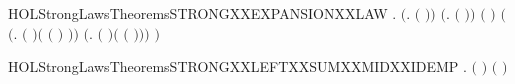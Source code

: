 \begin{SaveVerbatim}{HOLStrongLawsTheoremsSTRONGXXEXPANSIONXXLAW}
\HOLTokenTurnstile{} \HOLSymConst{\HOLTokenForall{}}   .
       \ensuremath{(}\HOLSymConst{\HOLTokenForall{}}.  \HOLSymConst{\HOLTokenLeq{}}  \HOLSymConst{\HOLTokenImp{}}  \ensuremath{(} \ensuremath{)}\ensuremath{)} \HOLSymConst{\HOLTokenConj{}}
       \ensuremath{(}\HOLSymConst{\HOLTokenForall{}}.  \HOLSymConst{\HOLTokenLeq{}}  \HOLSymConst{\HOLTokenImp{}}  \ensuremath{(} \ensuremath{)}\ensuremath{)} \HOLSymConst{\HOLTokenImp{}}
        \ensuremath{(}   \HOLSymConst{\ensuremath{\mid}}   \ensuremath{)}
         \ensuremath{(}
            \ensuremath{(}\HOLTokenLambda{}.  \ensuremath{(} \ensuremath{)}\HOLSymConst{\ensuremath{\ldotp}}\ensuremath{(} \ensuremath{(} \ensuremath{)} \HOLSymConst{\ensuremath{\mid}}   \ensuremath{)}\ensuremath{)}
             \HOLSymConst{\ensuremath{+}}
            \ensuremath{(}\HOLTokenLambda{}.  \ensuremath{(} \ensuremath{)}\HOLSymConst{\ensuremath{\ldotp}}\ensuremath{(}   \HOLSymConst{\ensuremath{\mid}}  \ensuremath{(} \ensuremath{)}\ensuremath{)}\ensuremath{)}
             \HOLSymConst{\ensuremath{+}}     \ensuremath{)}
\end{SaveVerbatim}
\newcommand{\HOLStrongLawsTheoremsSTRONGXXEXPANSIONXXLAW}{\UseVerbatim{HOLStrongLawsTheoremsSTRONGXXEXPANSIONXXLAW}}
\begin{SaveVerbatim}{HOLStrongLawsTheoremsSTRONGXXLEFTXXSUMXXMIDXXIDEMP}
\HOLTokenTurnstile{} \HOLSymConst{\HOLTokenForall{}}  .  \ensuremath{(} \HOLSymConst{\ensuremath{+}}  \HOLSymConst{\ensuremath{+}}  \HOLSymConst{\ensuremath{+}} \ensuremath{)} \ensuremath{(} \HOLSymConst{\ensuremath{+}}  \HOLSymConst{\ensuremath{+}} \ensuremath{)}
\end{SaveVerbatim}
